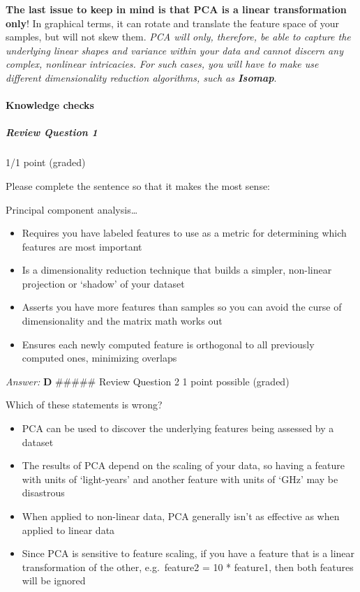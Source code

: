 \documentclass[11pt]{article}
\providecommand{\tightlist}{%
      \setlength{\itemsep}{0pt}\setlength{\parskip}{0pt}}
\begin{document}
\textbf{The last issue to keep in mind is that PCA is a linear
transformation only}! In graphical terms, it can rotate and translate
the feature space of your samples, but will not skew them. \emph{PCA
will only, therefore, be able to capture the underlying linear shapes
and variance within your data and cannot discern any complex, nonlinear
intricacies. For such cases, you will have to make use different
dimensionality reduction algorithms, such as \textbf{Isomap}}.

\hypertarget{knowledge-checks}{%
\paragraph{Knowledge checks}\label{knowledge-checks}}

\hypertarget{review-question-1}{%
\subparagraph{Review Question 1}\label{review-question-1}}

1/1 point (graded)

Please complete the sentence so that it makes the most sense:

Principal component analysis\ldots{}

\begin{itemize}
\tightlist
\item
  Requires you have labeled features to use as a metric for determining
  which features are most important
\item
  Is a dimensionality reduction technique that builds a simpler,
  non-linear projection or `shadow' of your dataset
\item
  Asserts you have more features than samples so you can avoid the curse
  of dimensionality and the matrix math works out
\item
  Ensures each newly computed feature is orthogonal to all previously
  computed ones, minimizing overlaps
\end{itemize}

\emph{Answer:} \textbf{D} \#\#\#\#\# Review Question 2 1 point possible
(graded)

Which of these statements is wrong?

\begin{itemize}
\tightlist
\item
  PCA can be used to discover the underlying features being assessed by
  a dataset
\item
  The results of PCA depend on the scaling of your data, so having a
  feature with units of `light-years' and another feature with units of
  `GHz' may be disastrous
\item
  When applied to non-linear data, PCA generally isn't as effective as
  when applied to linear data
\item
  Since PCA is sensitive to feature scaling, if you have a feature that
  is a linear transformation of the other, e.g.~feature2 = 10 *
  feature1, then both features will be ignored
\end{itemize}
\end{document}
